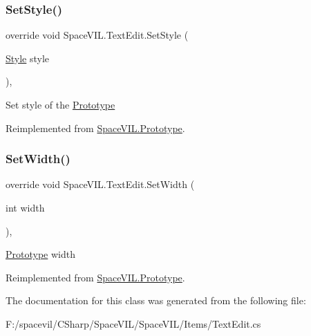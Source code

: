 \subsubsection{\texorpdfstring{Set\+Style()}{SetStyle()}}
{\footnotesize\ttfamily override void Space\+V\+I\+L.\+Text\+Edit.\+Set\+Style (\begin{DoxyParamCaption}\item[{\mbox{\hyperlink{class_space_v_i_l_1_1_decorations_1_1_style}{Style}}}]{style }\end{DoxyParamCaption})\hspace{0.3cm}{\ttfamily [inline]}, {\ttfamily [virtual]}}



Set style of the \mbox{\hyperlink{class_space_v_i_l_1_1_prototype}{Prototype}} 



Reimplemented from \mbox{\hyperlink{class_space_v_i_l_1_1_prototype_ae96644a6ace490afb376fb542161e541}{Space\+V\+I\+L.\+Prototype}}.

\mbox{\label{class_space_v_i_l_1_1_text_edit_a5e81be988e48303f9d552bdbe2953027}} 
\subsubsection{\texorpdfstring{Set\+Width()}{SetWidth()}}
{\footnotesize\ttfamily override void Space\+V\+I\+L.\+Text\+Edit.\+Set\+Width (\begin{DoxyParamCaption}\item[{int}]{width }\end{DoxyParamCaption})\hspace{0.3cm}{\ttfamily [inline]}, {\ttfamily [virtual]}}



\mbox{\hyperlink{class_space_v_i_l_1_1_prototype}{Prototype}} width 



Reimplemented from \mbox{\hyperlink{class_space_v_i_l_1_1_prototype_a6a4f1b9581f4d18f1c3a3e287d4b2a2b}{Space\+V\+I\+L.\+Prototype}}.



The documentation for this class was generated from the following file\+:\begin{DoxyCompactItemize}
\item 
F\+:/spacevil/\+C\+Sharp/\+Space\+V\+I\+L/\+Space\+V\+I\+L/\+Items/Text\+Edit.\+cs\end{DoxyCompactItemize}
